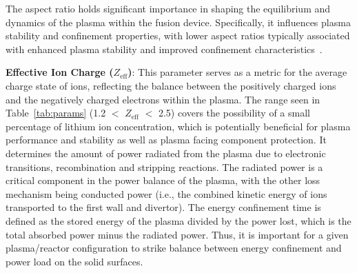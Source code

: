 \documentclass[journal]{IEEEtran}
\begin{document}
The aspect ratio holds significant importance in shaping the equilibrium and dynamics of the plasma within the fusion device. Specifically, it influences plasma stability and confinement properties, with lower aspect ratios typically associated with enhanced plasma stability and improved confinement characteristics~\cite{Costley2019}.

\textbf{Effective Ion Charge ($Z_{\text{eff}}$)}: This parameter serves as a metric for the average charge state of ions, reflecting the balance between the positively charged ions and the negatively charged electrons within the plasma. The range seen in Table~\ref{tab:params} (1.2 $<$ $Z_{\text{eff}}$ $<$ 2.5) covers the possibility of a small percentage of lithium ion concentration, which is potentially beneficial for plasma performance and stability as well as plasma facing component protection. It determines the amount of power radiated from the plasma due to electronic transitions, recombination and stripping reactions. The radiated power is a critical component in the power balance of the plasma, with the other loss mechanism being conducted power (i.e., the combined kinetic energy of ions transported to the first wall and divertor). The energy confinement time is defined as the stored energy of the plasma divided by the power lost, which is the total absorbed power minus the radiated power. Thus, it is important for a given plasma/reactor configuration to strike balance between energy confinement and power load on the solid surfaces. 





\end{document}
